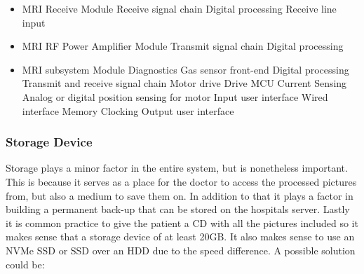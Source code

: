 \documentclass[conference]{IEEEtran}
\begin{document}
        \begin{itemize}
            \item MRI Receive Module \cite{RFRM}\newline
                    Receive signal chain\newline
                    Digital processing\newline
                    Receive line input
            \item MRI RF Power Amplifier Module \cite{RFPAM}\newline
                    Transmit signal chain\newline
                    Digital processing
            \item MRI subsystem Module \cite{RFSSM}\newline
                    Diagnostics\newline
                    Gas sensor front-end\newline
                    Digital processing\newline
                    Transmit and receive signal chain\newline
                    Motor drive\newline
                    Drive MCU\newline
                    Current Sensing\newline
                    Analog or digital position sensing for motor\newline
                    Input user interface\newline
                    Wired interface\newline
                    Memory\newline
                    Clocking\newline
                    Output user interface
        \end{itemize}    

        
    \subsubsection{Storage Device}

    Storage plays a minor factor in the entire system, but is nonetheless important. This is because it serves as a place for the doctor to access the processed pictures from, but also a medium to save them on. In addition to that it plays a factor in building a permanent back-up that can be stored on the hospitals server. Lastly it is common practice to give the patient a CD with all the pictures included so it makes sense that a storage device of at least 20GB. It also makes sense to use an NVMe SSD or SSD over an HDD due to the speed difference. A possible solution could be:
        
\end{document}
